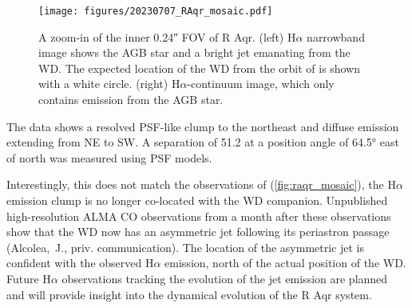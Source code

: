 \begin{figure}
    \centering
    \texttt{[image: figures/20230707\_RAqr\_mosaic.pdf]}
    \caption{A zoom-in of the inner \ang{;;0.24} FOV of R Aqr. (left) H$\alpha$ narrowband image shows the AGB star and a bright jet emanating from the WD. The expected location of the WD from the orbit of \citet{alcolea_determining_2023} is shown with a white circle. (right) H$\alpha$-continuum image, which only contains emission from the AGB star.\label{fig:raqr_mosaic}}
\end{figure}

The data shows a resolved PSF-like clump to the northeast and diffuse emission extending from NE to SW. A separation of \SI{51.2}{\mas} at a position angle of \ang{64.5} east of north was measured using PSF models. 

Interestingly, this does not match the observations of \citet{bujarrabal_high-resolution_2018,alcolea_determining_2023} (\autoref{fig:raqr_mosaic}), the H$\alpha$ emission clump is no longer co-located with the WD companion. Unpublished high-resolution ALMA CO observations from a month after these observations show that the WD now has an asymmetric jet following its periastron passage (Alcolea,~J., priv. communication). The location of the asymmetric jet is confident with the observed H$\alpha$ emission, north of the actual position of the WD. Future H$\alpha$ observations tracking the evolution of the jet emission are planned and will provide insight into the dynamical evolution of the R Aqr system.
